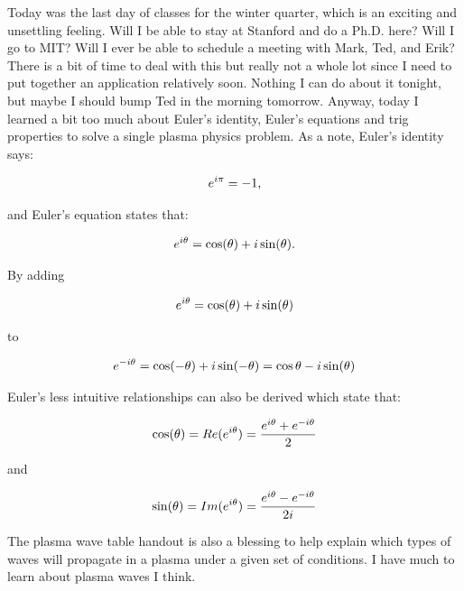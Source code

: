 \documentclass[12pt]{report}
\begin{document}
\par
Today was the last day of classes for the winter quarter, which is an exciting and unsettling feeling. Will I be able to stay at Stanford and do a Ph.D. here? Will I go to MIT? Will I ever be able to schedule a meeting with Mark, Ted, and Erik? There is a bit of time to deal with this but really not a whole lot since I need to put together an application relatively soon. Nothing I can do about it tonight, but maybe I should bump Ted in the morning tomorrow. Anyway, today I learned a bit too much about Euler's identity, Euler's equations and trig properties to solve a single plasma physics problem.  As a note, Euler's identity says:

\begin{equation}
\centering
e^{i\pi} = -1, 
\end{equation}

and Euler's equation states that:

\begin{equation}
\centering
e^{i\theta} = \cos(\theta) + i \sin(\theta).
\end{equation}

By adding 

\begin{equation}
\centering
e^{i\theta} = \cos(\theta) + i \sin(\theta)
\end{equation} 

to 

\begin{equation}
\centering
e^{-i\theta} = \cos(-\theta) + i \sin(-\theta) = \cos{\theta} - i\sin(\theta)
\end{equation}

Euler's less intuitive relationships can also be derived which state that:

\begin{equation}
\centering
\cos(\theta) = Re(e^{i\theta}) = \frac{e^{i\theta}+e^{-i\theta}}{2}
\end{equation}

and

\begin{equation}
\centering
\sin(\theta) = Im(e^{i\theta}) = \frac{e^{i\theta} - e^{-i\theta}}{2i}
\end{equation}

The plasma wave table handout is also a blessing to help explain which types of waves will propagate in a plasma under a given set of conditions. I have much to learn about plasma waves I think. 
\end{document}
